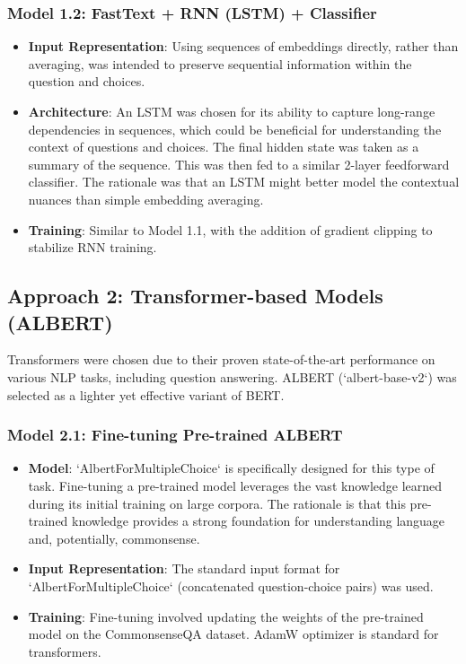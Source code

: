 \documentclass[10.5pt]{article}
\begin{document}
\subsubsection{Model 1.2: FastText + RNN (LSTM) + Classifier}
\begin{itemize}
    \item \textbf{Input Representation}: Using sequences of embeddings directly, rather than averaging, was intended to preserve sequential information within the question and choices.
    \item \textbf{Architecture}: An LSTM was chosen for its ability to capture long-range dependencies in sequences, which could be beneficial for understanding the context of questions and choices. The final hidden state was taken as a summary of the sequence. This was then fed to a similar 2-layer feedforward classifier. The rationale was that an LSTM might better model the contextual nuances than simple embedding averaging.
    \item \textbf{Training}: Similar to Model 1.1, with the addition of gradient clipping to stabilize RNN training.
\end{itemize}

\subsection{Approach 2: Transformer-based Models (ALBERT)}
Transformers were chosen due to their proven state-of-the-art performance on various NLP tasks, including question answering. ALBERT (`albert-base-v2`) was selected as a lighter yet effective variant of BERT.
\subsubsection{Model 2.1: Fine-tuning Pre-trained ALBERT}
\begin{itemize}
    \item \textbf{Model}: `AlbertForMultipleChoice` is specifically designed for this type of task. Fine-tuning a pre-trained model leverages the vast knowledge learned during its initial training on large corpora. The rationale is that this pre-trained knowledge provides a strong foundation for understanding language and, potentially, commonsense.
    \item \textbf{Input Representation}: The standard input format for `AlbertForMultipleChoice` (concatenated question-choice pairs) was used.
    \item \textbf{Training}: Fine-tuning involved updating the weights of the pre-trained model on the CommonsenseQA dataset. AdamW optimizer is standard for transformers.
\end{itemize}
\end{document}
